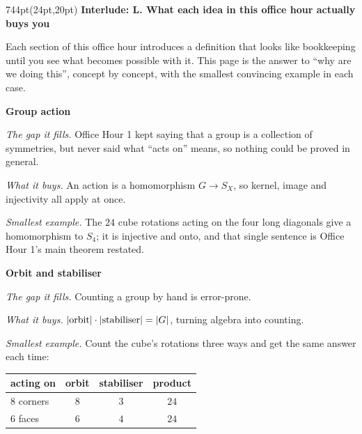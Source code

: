 \documentclass[10pt]{article}
\newcommand{\interlude}[2]{%
  \begin{textblock*}{744pt}(24pt,20pt)
    {\sffamily\bfseries\large\color{big} Interlude: #1}\par\vspace{4pt}
    \small #2\end{textblock*}\mbox{}\clearpage}
\begin{document}
\interlude{L. What each idea in this office hour actually buys you}{
\begin{minipage}[t]{744pt}\vspace{0pt}
\small
Each section of this office hour introduces a definition that looks like bookkeeping until you see what becomes possible with it. This page is the answer to ``why are we doing this'', concept by concept, with the smallest convincing example in each case.\par\vspace{5pt}
\begin{minipage}[t]{238pt}\vspace{0pt}
{\sffamily\bfseries\color{big} Group action}\par\vspace{1pt}
\emph{The gap it fills.} Office Hour 1 kept saying that a group is a collection of symmetries, but never said what ``acts on'' means, so nothing could be proved in general.\par\vspace{1pt}
\emph{What it buys.} An action is a homomorphism $G\to S_X$, so kernel, image and injectivity all apply at once.\par\vspace{1pt}
\emph{Smallest example.} The $24$ cube rotations acting on the four long diagonals give a homomorphism to $S_4$; it is injective and onto, and that single sentence is Office Hour 1's main theorem restated.\par\vspace{5pt}
{\sffamily\bfseries\color{big} Orbit and stabiliser}\par\vspace{1pt}
\emph{The gap it fills.} Counting a group by hand is error-prone.\par\vspace{1pt}
\emph{What it buys.} $|{\rm orbit}|\cdot|{\rm stabiliser}|=|G|$, turning algebra into counting.\par\vspace{1pt}
\emph{Smallest example.} Count the cube's rotations three ways and get the same answer each time:
\begin{center}\small
\begin{tabular}{@{}lccc@{}}
\toprule
acting on & orbit & stabiliser & product\\
\midrule
$8$ corners & $8$ & $3$ & $24$\\
$6$ faces & $6$ & $4$ & $24$\\

\end{tabular}
\end{center}
\end{minipage}
\end{minipage}}
\end{document}
